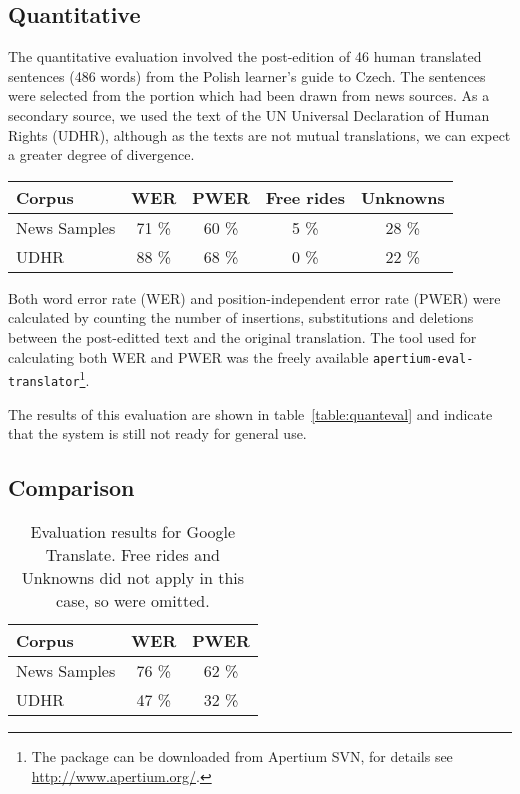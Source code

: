 \documentclass[11pt]{article}
\begin{document}
\subsection{Quantitative}

The quantitative evaluation involved the post-edition of 46 human translated
sentences (486 words) from the Polish learner's guide to Czech. The sentences were selected from 
the portion which had been drawn from news sources. As a secondary source, we 
used the text of the UN Universal Declaration of
Human Rights (UDHR), although as the texts are not mutual translations, we can expect
a greater degree of divergence.

\begin{table*}
\centering
\begin{tabular}{|l|c|c|c|c|}
\hline
Corpus    & WER & PWER & Free rides & Unknowns\\
\hline
News Samples & 71 \% & 60 \%  & 5 \%  & 28 \% \\
UDHR & 88 \% & 68 \%  & 0 \%  & 22 \% \\
\hline
\end{tabular}
    \caption{Evaluation results for the assimilation task. Free rides are those words which
       are identical in both the source and target language. Thus although they do not cause
       a degradation in translation quality, it is relevant to take them into account when
       evaluating the system. Unknown words are included as an indication of naïve coverage
       over the test sets.}
    \label{table:quanteval}
\end{table*}

Both word error rate (WER) and position-independent error rate (PWER) were 
calculated by counting the number of insertions, substitutions and deletions
between the post-editted text and the original translation. The tool used for
calculating both WER and PWER was the freely available {\tt\small apertium-eval-translator}\footnote{The
package can be downloaded from Apertium SVN, for details see {\small \url{http://www.apertium.org/}}.}.

The results of this evaluation are shown in table~\ref{table:quanteval} and 
indicate that the system is still not ready for general use.

\subsection{Comparison}

\begin{table}
\centering
\begin{tabular}{|l|c|c|}
\hline
Corpus    & WER & PWER \\
\hline
News Samples & 76 \% & 62 \%  \\
UDHR & 47 \% & 32 \% \\
\hline
\end{tabular}
    \caption{Evaluation results for Google Translate. Free rides and Unknowns
    did not apply in this case, so were omitted.}
    \label{table:googlecompar}
\end{table}
\end{document}
